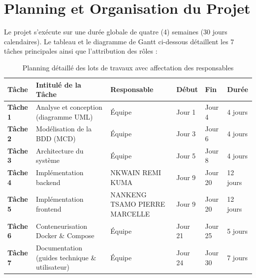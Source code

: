 \chapter{Planning et Organisation du Projet}

Le projet s'exécute sur une durée globale de quatre (4) semaines (30 jours calendaires). Le tableau et le diagramme de Gantt ci-dessous détaillent les 7 tâches principales ainsi que l'attribution des rôles :

\vspace{0.3cm}

\begin{table}[H]
\centering
\sffamily\small
\begin{tabular}{L{1.8cm} L{5.8cm} L{3.5cm} C{1.4cm} C{1.4cm} C{1.6cm}}
\toprule
{}
\textbf{Tâche} & \textbf{Intitulé de la Tâche} & \textbf{Responsable} & \textbf{Début} & \textbf{Fin} & \textbf{Durée} \\
\midrule
\textbf{Tâche 1} & Analyse et conception (diagramme UML) & Équipe & Jour 1 & Jour 4 & 4 jours \\
\textbf{Tâche 2} & Modélisation de la BDD (MCD) & Équipe & Jour 3 & Jour 6 & 4 jours \\
\textbf{Tâche 3} & Architecture du système & Équipe & Jour 5 & Jour 8 & 4 jours \\
\textbf{Tâche 4} & Implémentation backend & NKWAIN REMI KUMA & Jour 9 & Jour 20 & 12 jours \\
\textbf{Tâche 5} & Implémentation frontend & NANKENG TSAMO PIERRE MARCELLE & Jour 9 & Jour 20 & 12 jours \\
\textbf{Tâche 6} & Conteneurisation Docker \& Compose & Équipe & Jour 21 & Jour 25 & 5 jours \\
\textbf{Tâche 7} & Documentation (guides technique \& utilisateur) & Équipe & Jour 24 & Jour 30 & 7 jours \\
\bottomrule
\end{tabular}
\caption{Planning détaillé des lots de travaux avec affectation des responsables}
\end{table}

\vspace{0.4cm}


